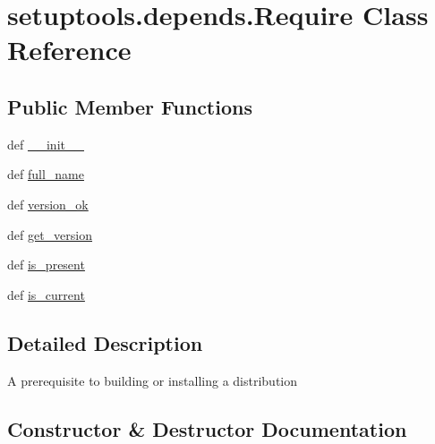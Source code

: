 \hypertarget{classsetuptools_1_1depends_1_1Require}{}\section{setuptools.\+depends.\+Require Class Reference}
\label{classsetuptools_1_1depends_1_1Require}
\subsection*{Public Member Functions}
\begin{DoxyCompactItemize}
\item 
def \hyperlink{classsetuptools_1_1depends_1_1Require_a811833fac8ab6c24185fccb543486f6d}{\+\_\+\+\_\+init\+\_\+\+\_\+}
\item 
def \hyperlink{classsetuptools_1_1depends_1_1Require_ae388a2534c4c4fd698a9a455ebe07fac}{full\+\_\+name}
\item 
def \hyperlink{classsetuptools_1_1depends_1_1Require_a3b9587f06abdd5cbac99cba2bc26165d}{version\+\_\+ok}
\item 
def \hyperlink{classsetuptools_1_1depends_1_1Require_a98d3e0ebeca2df4f4451da10b1042a10}{get\+\_\+version}
\item 
def \hyperlink{classsetuptools_1_1depends_1_1Require_af3c76ea211bd9fded29dcdb59c4000ea}{is\+\_\+present}
\item 
def \hyperlink{classsetuptools_1_1depends_1_1Require_a69f9ddef996719bdd95e3035b9046f58}{is\+\_\+current}
\end{DoxyCompactItemize}


\subsection{Detailed Description}
\begin{DoxyVerb}A prerequisite to building or installing a distribution\end{DoxyVerb}
 

\subsection{Constructor \& Destructor Documentation}
\hypertarget{classsetuptools_1_1depends_1_1Require_a811833fac8ab6c24185fccb543486f6d}{}
